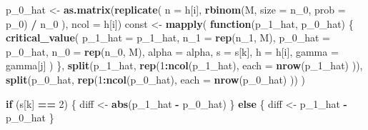 \documentclass[
]{article}
\newenvironment{Shaded}{\begin{snugshade}}{\end{snugshade}}
\newcommand{\ControlFlowTok}[1]{\textcolor[rgb]{0.13,0.29,0.53}{\textbf{#1}}}
\newcommand{\DataTypeTok}[1]{\textcolor[rgb]{0.13,0.29,0.53}{#1}}
\newcommand{\DecValTok}[1]{\textcolor[rgb]{0.00,0.00,0.81}{#1}}
\newcommand{\KeywordTok}[1]{\textcolor[rgb]{0.13,0.29,0.53}{\textbf{#1}}}
\newcommand{\NormalTok}[1]{#1}
\newcommand{\OperatorTok}[1]{\textcolor[rgb]{0.81,0.36,0.00}{\textbf{#1}}}
\newcommand{\StringTok}[1]{\textcolor[rgb]{0.31,0.60,0.02}{#1}}
\begin{document}
\begin{Shaded}
\begin{Highlighting}[]
{\NormalTok{      p_}\DecValTok{0}\NormalTok{_hat <-}\StringTok{ }\KeywordTok{as.matrix}\NormalTok{(}\KeywordTok{replicate}\NormalTok{(}
        \DataTypeTok{n =}\NormalTok{ h[i],}
        \KeywordTok{rbinom}\NormalTok{(M, }\DataTypeTok{size =}\NormalTok{ n_}\DecValTok{0}\NormalTok{, }\DataTypeTok{prob =}\NormalTok{ p_}\DecValTok{0}\NormalTok{) }\OperatorTok{/}\StringTok{ }\NormalTok{n_}\DecValTok{0}
\NormalTok{      ), }\DataTypeTok{ncol =}\NormalTok{ h[i])}
\NormalTok{      const <-}\StringTok{ }\KeywordTok{mapply}\NormalTok{(}
        \ControlFlowTok{function}\NormalTok{(p_}\DecValTok{1}\NormalTok{_hat, p_}\DecValTok{0}\NormalTok{_hat) \{}
          \KeywordTok{critical_value}\NormalTok{(}
            \DataTypeTok{p_1_hat =}\NormalTok{ p_}\DecValTok{1}\NormalTok{_hat, }\DataTypeTok{n_1 =} \KeywordTok{rep}\NormalTok{(n_}\DecValTok{1}\NormalTok{, M),}
            \DataTypeTok{p_0_hat =}\NormalTok{ p_}\DecValTok{0}\NormalTok{_hat, }\DataTypeTok{n_0 =} \KeywordTok{rep}\NormalTok{(n_}\DecValTok{0}\NormalTok{, M),}
            \DataTypeTok{alpha =}\NormalTok{ alpha, }\DataTypeTok{s =}\NormalTok{ s[k], }\DataTypeTok{h =}\NormalTok{ h[i],}
            \DataTypeTok{gamma =}\NormalTok{ gamma[j]}
\NormalTok{          )}
\NormalTok{        \},}
        \KeywordTok{split}\NormalTok{(p_}\DecValTok{1}\NormalTok{_hat, }\KeywordTok{rep}\NormalTok{(}\DecValTok{1}\OperatorTok{:}\KeywordTok{ncol}\NormalTok{(p_}\DecValTok{1}\NormalTok{_hat),}
          \DataTypeTok{each =} \KeywordTok{nrow}\NormalTok{(p_}\DecValTok{1}\NormalTok{_hat)}
\NormalTok{        )),}
        \KeywordTok{split}\NormalTok{(p_}\DecValTok{0}\NormalTok{_hat, }\KeywordTok{rep}\NormalTok{(}\DecValTok{1}\OperatorTok{:}\KeywordTok{ncol}\NormalTok{(p_}\DecValTok{0}\NormalTok{_hat),}
          \DataTypeTok{each =} \KeywordTok{nrow}\NormalTok{(p_}\DecValTok{0}\NormalTok{_hat)}
\NormalTok{        ))}
\NormalTok{      )}

      \ControlFlowTok{if}\NormalTok{ (s[k] }\OperatorTok{==}\StringTok{ }\DecValTok{2}\NormalTok{) \{}
\NormalTok{        diff <-}\StringTok{ }\KeywordTok{abs}\NormalTok{(p_}\DecValTok{1}\NormalTok{_hat }\OperatorTok{-}\StringTok{ }\NormalTok{p_}\DecValTok{0}\NormalTok{_hat)}
\NormalTok{      \} }\ControlFlowTok{else}\NormalTok{ \{}
\NormalTok{        diff <-}\StringTok{ }\NormalTok{p_}\DecValTok{1}\NormalTok{_hat }\OperatorTok{-}\StringTok{ }\NormalTok{p_}\DecValTok{0}\NormalTok{_hat}
\NormalTok{      \}}

}
\end{Highlighting}
\end{Shaded}
\end{document}
